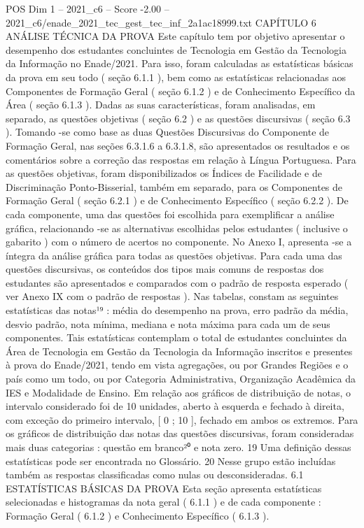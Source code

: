 \begin{textsample}{POS Dim 1 – 2021\_c6 – Score -2.00 – 2021\_c6/enade\_2021\_tec\_gest\_tec\_inf\_2a1ac18999.txt}  \label{ex:f1_pos_208}
CAPÍTULO 6 ANÁLISE TÉCNICA DA PROVA Este capítulo tem por objetivo apresentar o desempenho dos estudantes concluintes de Tecnologia em Gestão da Tecnologia da Informação no Enade/2021.
Para isso, foram calculadas as estatísticas básicas da prova em seu todo ( seção 6.1.1 ), bem como as estatísticas relacionadas aos Componentes de Formação Geral ( seção 6.1.2 ) e de Conhecimento Específico da Área ( seção 6.1.3 ).
Dadas as suas características, foram analisadas, em separado, as questões objetivas ( seção 6.2 ) e as questões discursivas ( seção 6.3 ).
Tomando -se como base as duas Questões Discursivas do Componente de Formação Geral, nas seções 6.3.1.6 a 6.3.1.8, são apresentados os resultados e os comentários sobre a correção das respostas em relação à Língua Portuguesa.
Para as questões objetivas, foram disponibilizados os Índices de Facilidade e de Discriminação Ponto-Bisserial, também em separado, para os Componentes de Formação Geral ( seção 6.2.1 ) e de Conhecimento Específico ( seção 6.2.2 ).
De cada componente, uma das questões foi escolhida para exemplificar a análise gráfica, relacionando -se as alternativas escolhidas pelos estudantes ( inclusive o gabarito ) com o número de acertos no componente.
No Anexo I, apresenta -se a íntegra da análise gráfica para todas as questões objetivas.
Para cada uma das questões discursivas, os conteúdos dos tipos mais comuns de respostas dos estudantes são apresentados e comparados com o padrão de resposta esperado ( ver Anexo IX com o padrão de respostas ).
Nas tabelas, constam as seguintes estatísticas das notas¹⁹ : média do desempenho na prova, erro padrão da média, desvio padrão, nota mínima, mediana e nota máxima para cada um de seus componentes.
Tais estatísticas contemplam o total de estudantes concluintes da Área de Tecnologia em Gestão da Tecnologia da Informação inscritos e presentes à prova do Enade/2021, tendo em vista agregações, ou por Grandes Regiões e o país como um todo, ou por Categoria Administrativa, Organização Acadêmica da IES e Modalidade de Ensino.
Em relação aos gráficos de distribuição de notas, o intervalo considerado foi de 10 unidades, aberto à esquerda e fechado à direita, com exceção do primeiro intervalo, [ 0 ; 10 ], fechado em ambos os extremos.
Para os gráficos de distribuição das notas das questões discursivas, foram consideradas mais duas categorias : questão em branco²⁰ e nota zero. 19 Uma definição dessas estatísticas pode ser encontrada no Glossário. 20 Nesse grupo estão incluídas também as respostas classificadas como nulas ou desconsideradas. 6.1 ESTATÍSTICAS BÁSICAS DA PROVA Esta seção apresenta estatísticas selecionadas e histogramas da nota geral ( 6.1.1 ) e de cada componente : Formação Geral ( 6.1.2 ) e Conhecimento Específico ( 6.1.3 ).

\end{textsample}
